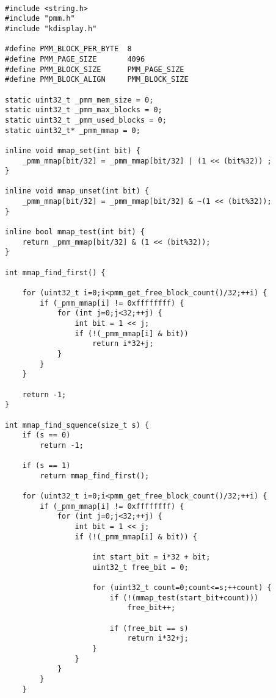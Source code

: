 \documentclass[document.tex]{subfiles}
\begin{document}
\begin{english}

\lstset{numberstyle=\tiny,numbers=left,stepnumber=1,numbersep=5pt,tabsize=2,extendedchars=true,breaklines=true,frame=b,showspaces=false, showtabs=false,xleftmargin=10pt,framexleftmargin=10pt,framexrightmargin=5pt,framexbottommargin=4pt,showstringspaces=false,language=C++}

\begin{lstlisting}[label=lst:pmm.cpp,caption=\en{Physical Memory Manager Implemetation}]

#include <string.h>
#include "pmm.h"
#include "kdisplay.h"

#define PMM_BLOCK_PER_BYTE	8
#define PMM_PAGE_SIZE		4096
#define PMM_BLOCK_SIZE		PMM_PAGE_SIZE
#define PMM_BLOCK_ALIGN		PMM_BLOCK_SIZE

static uint32_t _pmm_mem_size = 0;
static uint32_t _pmm_max_blocks = 0;
static uint32_t _pmm_used_blocks = 0;
static uint32_t* _pmm_mmap = 0;

inline void mmap_set(int bit) {
	_pmm_mmap[bit/32] = _pmm_mmap[bit/32] | (1 << (bit%32)) ;
}

inline void mmap_unset(int bit) {
	_pmm_mmap[bit/32] = _pmm_mmap[bit/32] & ~(1 << (bit%32));
}

inline bool mmap_test(int bit) {
	return _pmm_mmap[bit/32] & (1 << (bit%32));
}

int mmap_find_first() {
	
	for (uint32_t i=0;i<pmm_get_free_block_count()/32;++i) {
		if (_pmm_mmap[i] != 0xffffffff) {
			for (int j=0;j<32;++j) {
				int bit = 1 << j;
				if (!(_pmm_mmap[i] & bit))
					return i*32+j;
			}
		}
	}
	
	return -1;
}

int mmap_find_squence(size_t s) {
	if (s == 0)
		return -1;
	
	if (s == 1)
		return mmap_find_first();
		
	for (uint32_t i=0;i<pmm_get_free_block_count()/32;++i) {
		if (_pmm_mmap[i] != 0xffffffff) {
			for (int j=0;j<32;++j) {
				int bit = 1 << j;
				if (!(_pmm_mmap[i] & bit)) {
					
					int start_bit = i*32 + bit;
					uint32_t free_bit = 0;
					
					for (uint32_t count=0;count<=s;++count) {
						if (!(mmap_test(start_bit+count)))
							free_bit++;
							
						if (free_bit == s)
							return i*32+j;
					}
				}
			}
		}
	}
	

\end{lstlisting}
\end{english}
\end{document}
